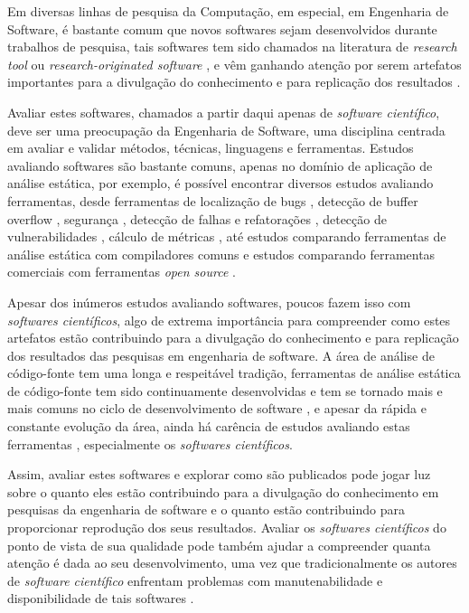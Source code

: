 
Em diversas linhas de pesquisa da Computação, em especial, em Engenharia de
Software, é bastante comum que novos softwares sejam desenvolvidos durante
trabalhos de pesquisa, tais softwares tem sido chamados na literatura de {\it
research tool} \cite{Portillo12} ou {\it research-originated software}
\cite{Kon2011}, e vêm ganhando atenção por serem artefatos importantes para a
divulgação do conhecimento e para replicação dos resultados \cite{Stodden2009}.

Avaliar estes softwares, chamados a partir daqui apenas de {\it software
científico}, deve ser uma preocupação da Engenharia de Software, uma disciplina
centrada em avaliar e validar métodos, técnicas, linguagens e ferramentas.
Estudos avaliando softwares são bastante comuns, apenas no domínio
de aplicação de análise estática, por exemplo, é possível encontrar diversos estudos
avaliando ferramentas, desde ferramentas de localização de bugs \cite{Rutar2004}, detecção
de buffer overflow \cite{Kratkiewicz2005}, segurança \cite{Okun2007,
Johns2011}, detecção de falhas e refatorações \cite{Wedyan2009}, detecção de
vulnerabilidades \cite{Li2010, Ataide2014}, cálculo de métricas
\cite{Alemerien2013}, até estudos comparando ferramentas de análise estática
com compiladores comuns \cite{Emanuelsson2008} e estudos comparando ferramentas
comerciais com ferramentas {\it open source} \cite{Al2010}.


Apesar dos inúmeros estudos avaliando softwares, poucos fazem isso com {\it
softwares científicos}, algo de extrema importância para compreender como estes
artefatos estão contribuindo para a divulgação do conhecimento e para
replicação dos resultados das pesquisas em engenharia de software. A área de
análise de código-fonte tem uma longa e respeitável tradição, ferramentas de
análise estática de código-fonte tem sido continuamente desenvolvidas e tem se
tornado mais e mais comuns no ciclo de desenvolvimento de software
\cite{Novak2010}, e apesar da rápida e constante evolução da área, ainda há
carência de estudos avaliando estas ferramentas \cite{Li2010}, especialmente os
{\it softwares científicos}.

Assim, avaliar estes softwares e explorar como são publicados pode jogar luz
sobre o quanto eles estão contribuindo para a divulgação do conhecimento em
pesquisas da engenharia de software e o quanto estão contribuindo para
proporcionar reprodução dos seus resultados. Avaliar os {\it softwares
científicos} do ponto de vista de sua qualidade pode também ajudar a
compreender quanta atenção é dada ao seu desenvolvimento, uma vez que
tradicionalmente os autores de {\it software científico} enfrentam problemas
com manutenabilidade e disponibilidade de tais softwares \cite{Prlic2012}.


